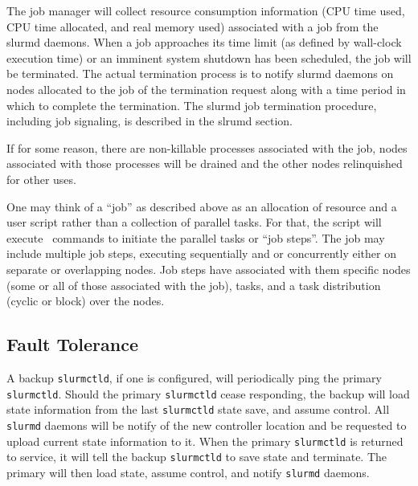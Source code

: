 The job manager will collect resource consumption information (CPU
time used, CPU time allocated, and real memory used) associated with
a job from the slurmd daemons.  When a job approaches its time limit
(as defined by wall-clock execution time) or an imminent system shutdown
has been scheduled, the job will be terminated.  The actual termination
process is to notify slurmd daemons on nodes allocated to the job of
the termination request along with a time period in which to complete
the termination.  The slurmd job termination procedure, including job
signaling, is described in the slrumd section.

If for some reason, there are non-killable processes associated with 
the job, nodes associated with those processes will be drained and 
the other nodes relinquished for other uses.

One may think of a ``job'' as described above as an allocation of resource 
and a user script rather than a collection of parallel tasks. For that, 
the script will execute \srun\ commands to initiate the parallel tasks 
or ``job steps''. The job may include multiple job steps, executing 
sequentially and or concurrently either on separate or overlapping nodes. 
Job steps have associated with them specific nodes (some or all of those 
associated with the job), tasks, and a task distribution (cyclic or 
block) over the nodes. 

%

\subsection{Fault Tolerance}

A backup {\tt slurmctld}, if one is configured, will periodically ping
the primary {\tt slurmctld}.  Should the primary {\tt slurmctld} cease
responding, the backup will load state information from the last 
{\tt slurmctld} state save, and assume control.  All {\tt slurmd} daemons
will be notify of the new controller location and be requested to upload
current state information to it.  When the primary {\tt slurmctld} is
returned to service, it will tell the backup {\tt slurmctld} to save
state and terminate.  The primary will then load state, assume control,
and notify {\tt slurmd} daemons.

